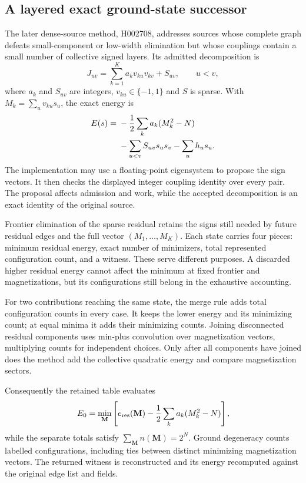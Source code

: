 \subsection{A layered exact ground-state successor}

The later dense-source method, H002708, addresses sources whose complete graph defeats small-component or low-width elimination but whose couplings contain a small number of collective signed layers. Its admitted decomposition is
\begin{equation}
 J_{uv}=\sum_{k=1}^{K}a_kv_{ku}v_{kv}+S_{uv},\qquad u<v,
\end{equation}
where $a_k$ and $S_{uv}$ are integers, $v_{ku}\in\{-1,1\}$ and $S$ is sparse. With $M_k=\sum_uv_{ku}s_u$, the exact energy is
\begin{align}
 E(s)={}&-\frac12\sum_k a_k(M_k^2-N)\notag\\
 &-\sum_{u<v}S_{uv}s_us_v-\sum_u h_us_u.
\end{align}
The implementation may use a floating-point eigensystem to propose the sign vectors. It then checks the displayed integer coupling identity over every pair. The proposal affects admission and work, while the accepted decomposition is an exact identity of the original source.

Frontier elimination of the sparse residual retains the signs still needed by future residual edges and the full vector $(M_1,\ldots,M_K)$. Each state carries four pieces: minimum residual energy, exact number of minimizers, total represented configuration count, and a witness. These serve different purposes. A discarded higher residual energy cannot affect the minimum at fixed frontier and magnetizations, but its configurations still belong in the exhaustive accounting.

For two contributions reaching the same state, the merge rule adds total configuration counts in every case. It keeps the lower energy and its minimizing count; at equal minima it adds their minimizing counts. Joining disconnected residual components uses min-plus convolution over magnetization vectors, multiplying counts for independent choices. Only after all components have joined does the method add the collective quadratic energy and compare magnetization sectors.

Consequently the retained table evaluates
\begin{equation}
 E_0=\min_{\mathbf M}\left[e_{\rm res}(\mathbf M)
 -\frac12\sum_k a_k(M_k^2-N)\right],
\end{equation}
while the separate totals satisfy $\sum_{\mathbf M}n(\mathbf M)=2^N$. Ground degeneracy counts labelled configurations, including ties between distinct minimizing magnetization vectors. The returned witness is reconstructed and its energy recomputed against the original edge list and fields.

